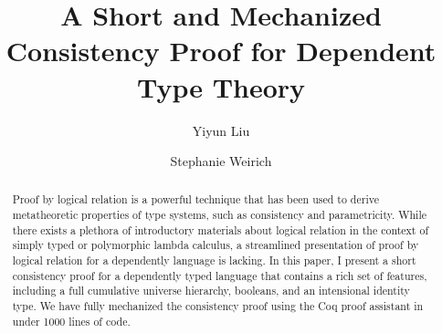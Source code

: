 \documentclass[acmsmall]{acmart}
\begin{document}
\title{A Short and Mechanized Consistency Proof for Dependent Type Theory}

\author{Yiyun Liu}

\author{Stephanie Weirich}


\begin{abstract}
Proof by logical relation is a powerful technique that has been used
to derive metatheoretic properties of type systems, such as
consistency and parametricity. While there exists a
plethora of introductory materials about logical relation in the
context of simply typed or polymorphic lambda calculus, a streamlined
presentation of proof by logical relation for a dependently language
is lacking. In this paper, I present a short
consistency proof for a dependently typed language that contains a
rich set of features, including a full cumulative universe
hierarchy, booleans, and an intensional identity type. We have
fully mechanized the consistency proof using the Coq proof assistant
in under 1000 lines of code.
\end{abstract}

\end{document}
